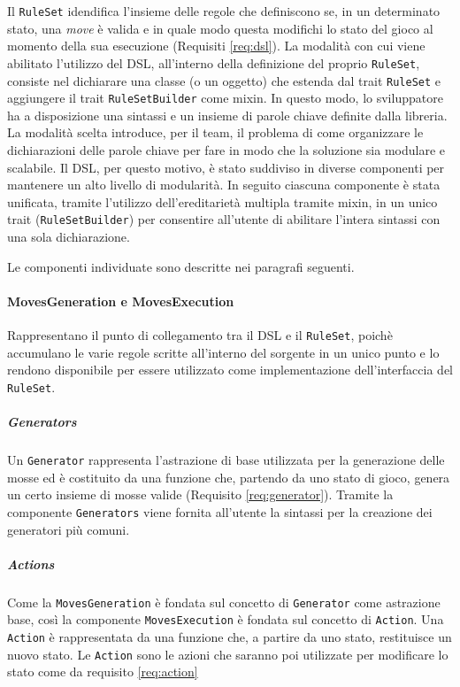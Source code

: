 Il \texttt{RuleSet} idendifica l'insieme delle regole che definiscono se, in un determinato stato, una \textit{move} è valida e in quale modo questa modifichi lo stato del gioco al momento della sua esecuzione (Requisiti \ref{req:dsl}).
%
La modalità con cui viene abilitato l'utilizzo del DSL, all'interno della definizione del proprio \texttt{RuleSet}, consiste nel dichiarare una classe (o un oggetto) che estenda dal trait \texttt{RuleSet} e aggiungere il trait \texttt{RuleSetBuilder} come mixin.
%
In questo modo, lo sviluppatore ha a disposizione una sintassi e un insieme di parole chiave definite dalla libreria.
%
La modalità scelta introduce, per il team, il problema di come organizzare le dichiarazioni delle parole chiave per fare in modo che la soluzione sia modulare e scalabile.
%
Il DSL, per questo motivo, è stato suddiviso in diverse componenti per mantenere un alto livello di modularità.
%
In seguito ciascuna componente è stata unificata, tramite l'utilizzo dell'ereditarietà multipla tramite mixin, in un unico trait (\texttt{RuleSetBuilder}) per consentire all'utente di abilitare l'intera sintassi con una sola dichiarazione.

Le componenti individuate sono descritte nei paragrafi seguenti.

\paragraph{MovesGeneration e MovesExecution}
Rappresentano il punto di collegamento tra il DSL e il \texttt{RuleSet}, poichè accumulano le varie regole scritte all'interno del sorgente in un unico punto e lo rendono disponibile per essere utilizzato come implementazione dell'interfaccia del \texttt{RuleSet}.

\subparagraph{Generators}
Un \texttt{Generator} rappresenta l'astrazione di base utilizzata per la generazione delle mosse ed è costituito da una funzione che, partendo da uno stato di gioco, genera un certo insieme di mosse valide (Requisito \ref{req:generator}).
%
Tramite la componente \texttt{Generators} viene fornita all'utente la sintassi per la creazione dei generatori più comuni.

\subparagraph{Actions}
Come la \texttt{MovesGeneration} è fondata sul concetto di \texttt{Generator} come astrazione base, così la componente \texttt{MovesExecution} è fondata sul concetto di \texttt{Action}.
%
Una \texttt{Action} è rappresentata da una funzione che, a partire da uno stato, restituisce un nuovo stato.
%
Le \texttt{Action} sono le azioni che saranno poi utilizzate per modificare lo stato come da requisito \ref{req:action}

